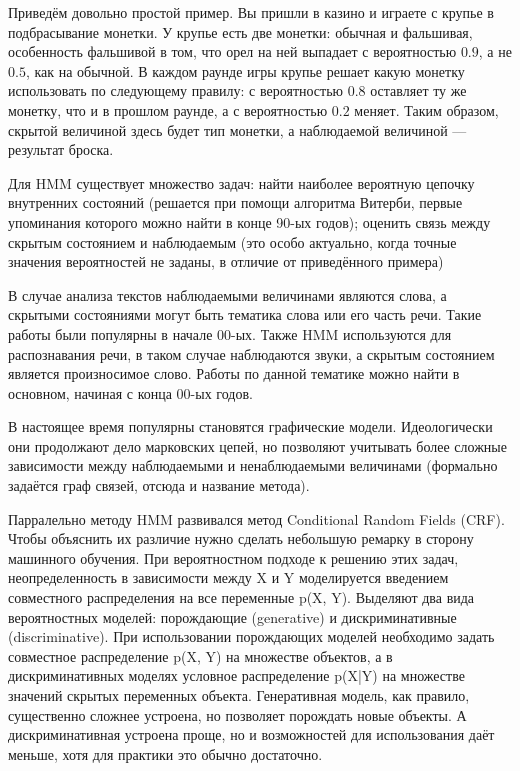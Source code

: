\documentclass[a4paper,14pt]{extarticle}
\begin{document}
Приведём довольно простой пример. Вы пришли в казино и играете с крупье в подбрасывание монетки. У крупье есть две монетки: обычная и фальшивая, особенность фальшивой в том, что орел на ней выпадает с вероятностью $0.9$, а не $0.5$, как на обычной. В каждом раунде игры крупье решает какую монетку использовать по следующему правилу: с вероятностью $0.8$ оставляет ту же монетку, что и в прошлом раунде, а с вероятностью $0.2$ меняет. Таким образом, скрытой величиной здесь будет тип монетки, а наблюдаемой величиной --- результат броска.

Для HMM существует множество задач: найти наиболее вероятную цепочку внутренних состояний (решается при помощи алгоритма Витерби, первые упоминания которого можно найти в конце 90-ых годов); оценить связь между скрытым состоянием и наблюдаемым (это особо актуально, когда точные значения вероятностей не заданы, в отличие от приведённого примера)

В случае анализа текстов наблюдаемыми величинами являются слова, а скрытыми состояниями могут быть тематика слова или его часть речи. Такие работы были популярны в начале 00-ых. Также HMM используются для распознавания речи, в таком случае наблюдаются звуки, а скрытым состоянием является произносимое слово. Работы по данной тематике можно найти в основном, начиная с конца 00-ых годов.

В настоящее время популярны становятся графические модели. Идеологически они продолжают дело марковских цепей, но позволяют учитывать более сложные зависимости между наблюдаемыми и ненаблюдаемыми величинами (формально задаётся граф связей, отсюда и название метода).

Парралельно методу HMM развивался метод Conditional Random Fields (CRF). Чтобы объяснить их различие нужно сделать небольшую ремарку в сторону машинного обучения. При вероятностном подходе к решению этих задач, неопределенность в зависимости между X и Y моделируется введением совместного распределения на все переменные p(X, Y). Выделяют два вида вероятностных моделей: порождающие (generative) и дискриминативные (discriminative). При использовании порождающих моделей необходимо задать совместное распределение p(X, Y) на множестве
объектов, а в дискриминативных моделях условное распределение p(X|Y) на множестве значений скрытых переменных объекта. Генеративная модель, как правило, существенно сложнее устроена, но позволяет порождать новые объекты. А дискриминативная устроена проще, но и возможностей для использования даёт меньше, хотя для практики это обычно достаточно.
\end{document}

